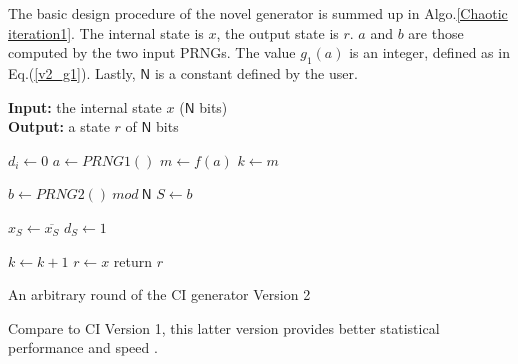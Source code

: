 The basic design procedure of the novel generator is summed up in Algo.\ref{Chaotic iteration1}.
The internal state is $x$, the output state is $r$. $a$ and $b$ are those computed by the two input
PRNGs. The value $g_1(a)$ is an integer, defined as in Eq.(\ref{v2_g1}). Lastly, $\mathsf{N}$ is a constant 
defined by the user.
\begin{algorithm}
\textbf{Input:} the internal state $x$ ($\mathsf{N}$ bits)\\
\textbf{Output:} a state $r$ of $\mathsf{N}$ bits
\begin{algorithmic}[1]
{
\STATE$d_i\leftarrow{0}$\;
}
\ENDFOR
\STATE$a\leftarrow{PRNG1()}$\;
\STATE$m\leftarrow{f(a)}$\;
\STATE$k\leftarrow{m}$\;

\STATE$b\leftarrow{PRNG2()~mod~\mathsf{N}}$\;
\STATE$S\leftarrow{b}$\;
    {
\STATE      $x_S\leftarrow{ \overline{x_S}}$\;
\STATE      $d_S\leftarrow{1}$\;
    
    }
    {
\STATE      $k\leftarrow{ k+1}$\;
    }\ENDIF
\ENDWHILE
$r\leftarrow{x}$\;
return $r$\;
\medskip
\caption{An arbitrary round of the CI generator Version 2}
\label{Chaotic iteration1}
\end{algorithmic}
\end{algorithm}

Compare to CI Version 1, this latter version provides better statistical performance and speed \cite{bfgw11:ij}.

%
%
%
%

